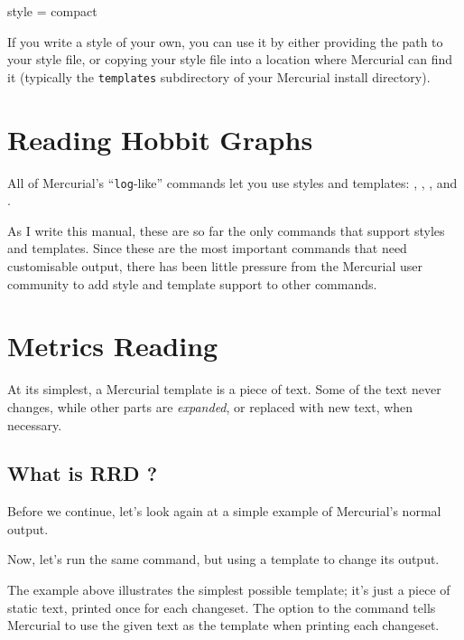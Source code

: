 \begin{codesample2}
  [ui]
  style = compact
\end{codesample2}

If you write a style of your own, you can use it by either providing
the path to your style file, or copying your style file into a
location where Mercurial can find it (typically the \texttt{templates}
subdirectory of your Mercurial install directory).

\section{Reading Hobbit Graphs}

All of Mercurial's ``\texttt{log}-like'' commands let you use styles
and templates: , , , and
.

As I write this manual, these are so far the only commands that
support styles and templates.  Since these are the most important
commands that need customisable output, there has been little pressure
from the Mercurial user community to add style and template support to
other commands.

\section{Metrics Reading }

At its simplest, a Mercurial template is a piece of text.  Some of the
text never changes, while other parts are \emph{expanded}, or replaced
with new text, when necessary.


\subsection{What is RRD ?}


Before we continue, let's look again at a simple example of
Mercurial's normal output.


Now, let's run the same command, but using a template to change its
output.


The example above illustrates the simplest possible template; it's
just a piece of static text, printed once for each changeset.  The
 option to the  command tells
Mercurial to use the given text as the template when printing each
changeset.

